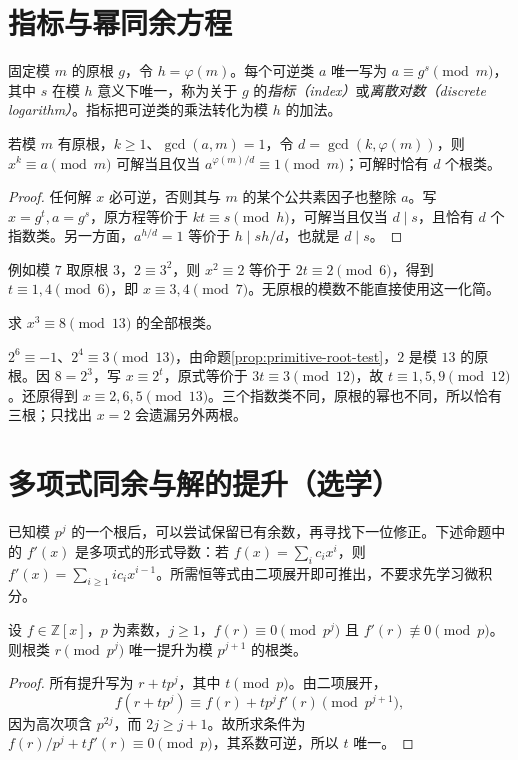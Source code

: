\section{指标与幂同余方程}

固定模 $m$ 的原根 $g$，令 $h=\varphi(m)$。每个可逆类 $a$ 唯一写为 $a\equiv g^s\pmod m$，其中 $s$ 在模 $h$ 意义下唯一，称为关于 $g$ 的\emph{指标（index）}或\emph{离散对数（discrete logarithm）}。指标把可逆类的乘法转化为模 $h$ 的加法。

\begin{proposition}
若模 $m$ 有原根，$k\ge1$、$\gcd(a,m)=1$，令 $d=\gcd(k,\varphi(m))$，则 $x^k\equiv a\pmod m$ 可解当且仅当 $a^{\varphi(m)/d}\equiv1\pmod m$；可解时恰有 $d$ 个根类。
\end{proposition}
\begin{proof}
任何解 $x$ 必可逆，否则其与 $m$ 的某个公共素因子也整除 $a$。写 $x=g^t,a=g^s$，原方程等价于 $kt\equiv s\pmod h$，可解当且仅当 $d\mid s$，且恰有 $d$ 个指数类。另一方面，$a^{h/d}=1$ 等价于 $h\mid sh/d$，也就是 $d\mid s$。
\end{proof}

例如模 $7$ 取原根 $3$，$2\equiv3^2$，则 $x^2\equiv2$ 等价于 $2t\equiv2\pmod6$，得到 $t\equiv1,4\pmod6$，即 $x\equiv3,4\pmod7$。无原根的模数不能直接使用这一化简。

\begin{example}
求 $x^3\equiv8\pmod{13}$ 的全部根类。
\end{example}
\begin{solve}
$2^6\equiv-1$、$2^4\equiv3\pmod{13}$，由命题\ref{prop:primitive-root-test}，$2$ 是模 $13$ 的原根。因 $8=2^3$，写 $x\equiv2^t$，原式等价于 $3t\equiv3\pmod{12}$，故 $t\equiv1,5,9\pmod{12}$。还原得到 $x\equiv2,6,5\pmod{13}$。三个指数类不同，原根的幂也不同，所以恰有三根；只找出 $x=2$ 会遗漏另外两根。
\end{solve}

\section{多项式同余与解的提升（选学）}

已知模 $p^j$ 的一个根后，可以尝试保留已有余数，再寻找下一位修正。下述命题中的 $f'(x)$ 是多项式的形式导数：若 $f(x)=\sum_i c_ix^i$，则 $f'(x)=\sum_{i\ge1}ic_ix^{i-1}$。所需恒等式由二项展开即可推出，不要求先学习微积分。

\begin{proposition}[简单根的亨泽尔提升]
\label{prop:hensel}
设 $f\in\mathbb Z[x]$，$p$ 为素数，$j\ge1$，$f(r)\equiv0\pmod{p^j}$ 且 $f'(r)\not\equiv0\pmod p$。则根类 $r\pmod{p^j}$ 唯一提升为模 $p^{j+1}$ 的根类。
\end{proposition}
\begin{proof}
所有提升写为 $r+tp^j$，其中 $t\pmod p$。由二项展开，
\[
 f(r+tp^j)\equiv f(r)+tp^jf'(r)\pmod{p^{j+1}},
\]
因为高次项含 $p^{2j}$，而 $2j\ge j+1$。故所求条件为 $f(r)/p^j+tf'(r)\equiv0\pmod p$，其系数可逆，所以 $t$ 唯一。
\end{proof}

